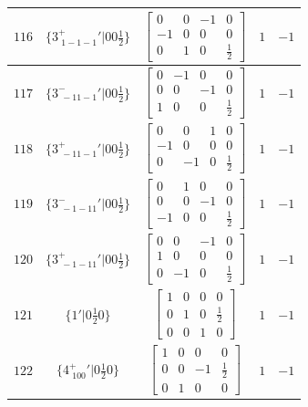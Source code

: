 \documentclass[fleqn,8pt]{jsarticle}
\begin{document}
\begin{longtable}{ccccc}
$ 116 $ & $ \{3^{+}_{\,\,1-1-1}{}'|0 0 \frac{1}{2}\} $ & $ \begin{bmatrix} 0 & 0 & -1 & 0 \\ -1 & 0 & 0 & 0 \\ 0 & 1 & 0 & \frac{1}{2} \end{bmatrix} $ & $ 1 $ & $ -1 $ \\ \hline
$ 117 $ & $ \{3^{-}_{\,\,-11-1}{}'|0 0 \frac{1}{2}\} $ & $ \begin{bmatrix} 0 & -1 & 0 & 0 \\ 0 & 0 & -1 & 0 \\ 1 & 0 & 0 & \frac{1}{2} \end{bmatrix} $ & $ 1 $ & $ -1 $ \\ \hline
$ 118 $ & $ \{3^{+}_{\,\,-11-1}{}'|0 0 \frac{1}{2}\} $ & $ \begin{bmatrix} 0 & 0 & 1 & 0 \\ -1 & 0 & 0 & 0 \\ 0 & -1 & 0 & \frac{1}{2} \end{bmatrix} $ & $ 1 $ & $ -1 $ \\ \hline
$ 119 $ & $ \{3^{-}_{\,\,-1-11}{}'|0 0 \frac{1}{2}\} $ & $ \begin{bmatrix} 0 & 1 & 0 & 0 \\ 0 & 0 & -1 & 0 \\ -1 & 0 & 0 & \frac{1}{2} \end{bmatrix} $ & $ 1 $ & $ -1 $ \\ \hline
$ 120 $ & $ \{3^{+}_{\,\,-1-11}{}'|0 0 \frac{1}{2}\} $ & $ \begin{bmatrix} 0 & 0 & -1 & 0 \\ 1 & 0 & 0 & 0 \\ 0 & -1 & 0 & \frac{1}{2} \end{bmatrix} $ & $ 1 $ & $ -1 $ \\ \hline
$ 121 $ & $ \{1{}'|0 \frac{1}{2} 0\} $ & $ \begin{bmatrix} 1 & 0 & 0 & 0 \\ 0 & 1 & 0 & \frac{1}{2} \\ 0 & 0 & 1 & 0 \end{bmatrix} $ & $ 1 $ & $ -1 $ \\ \hline
$ 122 $ & $ \{4^{+}_{\,\,100}{}'|0 \frac{1}{2} 0\} $ & $ \begin{bmatrix} 1 & 0 & 0 & 0 \\ 0 & 0 & -1 & \frac{1}{2} \\ 0 & 1 & 0 & 0 \end{bmatrix} $ & $ 1 $ & $ -1 $ \\ \hline

\end{longtable}
\end{document}
